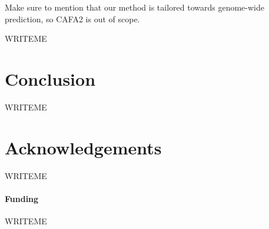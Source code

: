 \documentclass{bioinfo}
\begin{document}
Make sure to mention that our method is tailored towards genome-wide
prediction, so CAFA2 is out of scope.

WRITEME



\section{Conclusion}

WRITEME



\section*{Acknowledgements}

WRITEME



\paragraph{Funding\textcolon}

WRITEME




\end{document}

